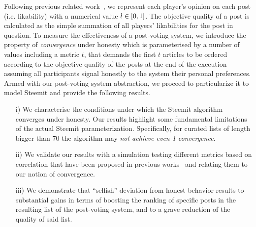     Following previous related
    work~\cite{ghosh2011incentivizing,askalidis2013theoretical}, we represent
    each player's opinion on each post (i.e. likability) with a numerical value
    $l \in [ 0,1 ]$. The objective quality of a post is calculated as the
    simple summation of all players' likabilities for the post in question. To
    measure the effectiveness of a post-voting system, we introduce the property
    of \textit{convergence} under honesty which is parameterised by a number of
    values including a metric $t$, that demands the first $t$ articles to be
    ordered according to the objective quality of the posts at the end of the
    execution assuming all participants signal honestly to the system their
    personal preferences. Armed with our post-voting system abstraction, we
    proceed to particularize it to model Steemit and provide the following
    results.

    \begin{itemize}
      \item[i)] We characterise the conditions under which the Steemit algorithm
      converges under honesty. Our results highlight some fundamental
      limitations of the actual Steemit parameterization. Specifically, for
      curated lists of length bigger than 70 the algorithm may {\em not achieve
      even 1-convergence}.
      \item[ii)] We validate our results with a simulation testing different
      metrics based on correlation that have been proposed in previous
      works~\cite{kendall1955rank,spearman1904proof} and relating them to our
      notion of convergence.
      \item[iii)] We demonstrate that ``selfish'' deviation from honest behavior
      results to substantial gains in terms of boosting the ranking of specific
      posts in the resulting list of the post-voting system, and to a grave
      reduction of the quality of said list.
    \end{itemize}


